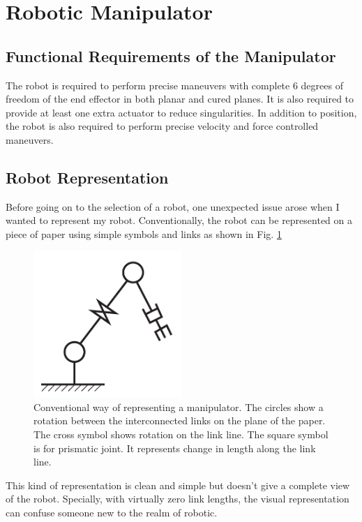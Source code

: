 \section{Robotic Manipulator}\label{chapter2}
{
    \subsection{Functional Requirements of the Manipulator}
    {
        The robot is required to perform precise maneuvers with complete $6$ degrees of freedom of the end effector in both planar and cured planes. It is also required to provide at least one extra actuator to reduce singularities. In addition to position, the robot is also required to perform precise velocity and force controlled maneuvers.
    }
    \subsection{Robot Representation}
    {
        Before going on to the selection of a robot, one unexpected issue arose when I wanted to represent my robot. Conventionally, the robot can be represented on a piece of paper using simple symbols and links as shown in Fig. \ref{FigConventionalRep}
        \begin{figure}
          \centering
          \includegraphics[width=0.5\textwidth]{RobotRep1.pdf}
          \caption{Conventional way of representing a manipulator. The circles show a rotation between the interconnected links on the plane of the paper. The cross symbol shows rotation on the link line. The square symbol is for prismatic joint. It represents change in length along the link line.}\label{FigConventionalRep}
        \end{figure}
        This kind of representation is clean and simple but doesn't give a complete view of the robot. Specially, with virtually zero link lengths, the visual representation can confuse someone new to the realm of robotic.

}}
